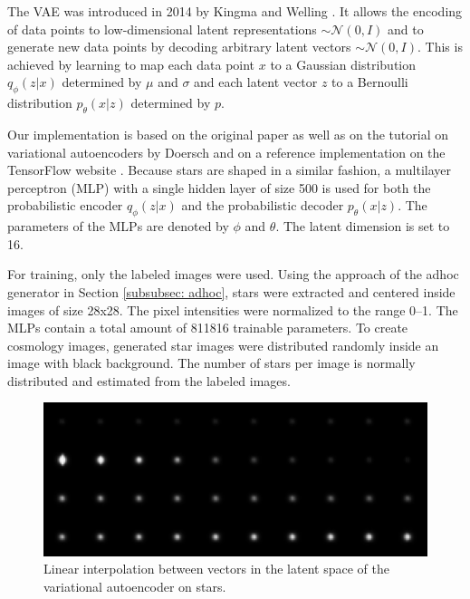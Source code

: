\documentclass[10pt,conference,compsocconf]{IEEEtran}
\begin{document}
The VAE was introduced in 2014 by Kingma and Welling \cite{DBLP:journals/corr/KingmaW13}. It allows the encoding of data points to low-dimensional latent representations  $\sim\mathcal{N}(0, I)$ and to generate new data points by decoding arbitrary latent vectors $\sim\mathcal{N}(0, I)$. This is achieved by learning to map each data point $x$ to a Gaussian distribution $q_{\phi}(z|x)$ determined by $\mu$ and $\sigma$ and each latent vector $z$ to a Bernoulli distribution $p_{\theta}(x|z)$ determined by $p$.
 
Our implementation is based on the original paper as well as on the tutorial on variational autoencoders by Doersch \cite{doersch2016tutorial} and on a reference implementation on the TensorFlow website \cite{cvaetf}. Because stars are shaped in a similar fashion, a multilayer perceptron (MLP) with a single hidden layer of size \SI{500}{} is used for both the probabilistic encoder $q_{\phi}(z|x)$ and the probabilistic decoder $p_{\theta}(x|z)$. The parameters of the MLPs are denoted by $\phi$ and $\theta$. The latent dimension is set to \SI{16}{}. 

For training, only the labeled images were used. Using the approach of the adhoc generator in Section \ref{subsubsec: adhoc}, stars were extracted and centered inside images of size \SI{28}{}x\SI{28}{}. The pixel intensities were normalized to the range \SIrange{0}{1}{}. The MLPs contain a total amount of \SI{811816}{} trainable parameters. To create cosmology images, generated star images were distributed randomly inside an image with black background. The number of stars per image is normally distributed and estimated from the labeled images. 


\begin{figure}
    \centering
    \includegraphics[width=\columnwidth]{assets/vae_interpolation_resized.png}
    \caption{Linear interpolation between vectors in the latent space of the variational autoencoder on stars.}
    \label{fig:vae_interpolation}
\end{figure}
\end{document}
